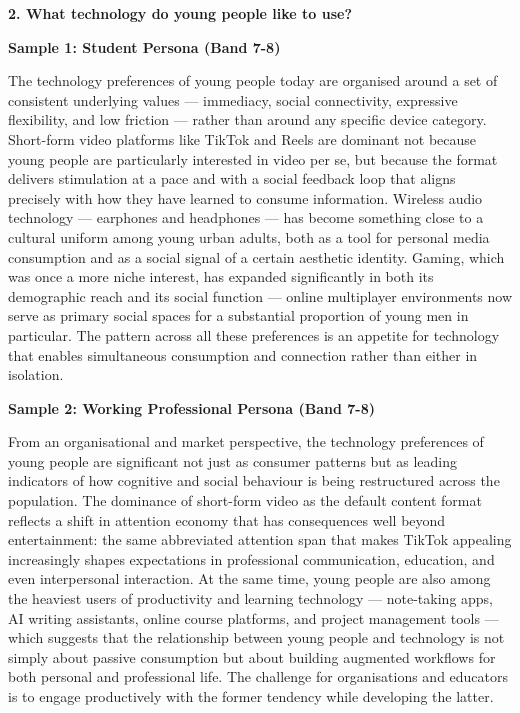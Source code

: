 \begin{ieltsquestion}
\textbf{2. What technology do young people like to use?}
\end{ieltsquestion}
\textbf{Sample 1: Student Persona (Band 7-8)}

The technology preferences of young people today are organised around a set of consistent underlying values — immediacy, social connectivity, expressive flexibility, and low friction — rather than around any specific device category. Short-form video platforms like TikTok and Reels are dominant not because young people are particularly interested in video per se, but because the format delivers stimulation at a pace and with a social feedback loop that aligns precisely with how they have learned to consume information. Wireless audio technology — earphones and headphones — has become something close to a cultural uniform among young urban adults, both as a tool for personal media consumption and as a social signal of a certain aesthetic identity. Gaming, which was once a more niche interest, has expanded significantly in both its demographic reach and its social function — online multiplayer environments now serve as primary social spaces for a substantial proportion of young men in particular. The pattern across all these preferences is an appetite for technology that enables simultaneous consumption and connection rather than either in isolation.

\textbf{Sample 2: Working Professional Persona (Band 7-8)}

From an organisational and market perspective, the technology preferences of young people are significant not just as consumer patterns but as leading indicators of how cognitive and social behaviour is being restructured across the population. The dominance of short-form video as the default content format reflects a shift in attention economy that has consequences well beyond entertainment: the same abbreviated attention span that makes TikTok appealing increasingly shapes expectations in professional communication, education, and even interpersonal interaction. At the same time, young people are also among the heaviest users of productivity and learning technology — note-taking apps, AI writing assistants, online course platforms, and project management tools — which suggests that the relationship between young people and technology is not simply about passive consumption but about building augmented workflows for both personal and professional life. The challenge for organisations and educators is to engage productively with the former tendency while developing the latter.

